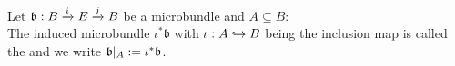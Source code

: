 \\ Let $\mathfrak{b}: \bundle{B}{E}{i}{j}$ be a microbundle and $A \subseteq B$:
\\ The induced microbundle $\iota^*\mathfrak{b}$ with $\iota: A \incl B$ being the inclusion map is called the  and we write $\mathfrak{b} \restrict{A} := \iota^*\mathfrak{b}$.